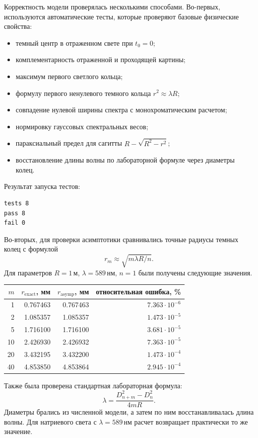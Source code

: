 \documentclass[12pt,a4paper]{article}
\begin{document}
Корректность модели проверялась несколькими способами. Во-первых, используются автоматические тесты,
которые проверяют базовые физические свойства:
\begin{itemize}
  \item темный центр в отраженном свете при \(t_0=0\);
  \item комплементарность отраженной и проходящей картины;
  \item максимум первого светлого кольца;
  \item формулу первого ненулевого темного кольца \(r^2\approx\lambda R\);
  \item совпадение нулевой ширины спектра с монохроматическим расчетом;
  \item нормировку гауссовых спектральных весов;
  \item параксиальный предел для сагитты \(R-\sqrt{R^2-r^2}\);
  \item восстановление длины волны по лабораторной формуле через диаметры колец.
\end{itemize}

Результат запуска тестов:
\begin{lstlisting}
tests 8
pass 8
fail 0
\end{lstlisting}

Во-вторых, для проверки асимптотики сравнивались точные радиусы темных колец с формулой
\[
r_m\approx \sqrt{m\lambda R/n}.
\]
Для параметров \(R=1\,\mathrm{м}\), \(\lambda=589\,\mathrm{нм}\), \(n=1\) были получены следующие
значения.

\begin{table}[h]
\centering
\begin{tabular}{rrrr}
\toprule
\(m\) & \(r_{\mathrm{exact}}\), мм & \(r_{\mathrm{asymp}}\), мм & относительная ошибка, \% \\
\midrule
1  & 0.767463 & 0.767463 & \(7.363\cdot10^{-6}\) \\
2  & 1.085357 & 1.085357 & \(1.473\cdot10^{-5}\) \\
5  & 1.716100 & 1.716100 & \(3.681\cdot10^{-5}\) \\
10 & 2.426930 & 2.426932 & \(7.363\cdot10^{-5}\) \\
20 & 3.432195 & 3.432200 & \(1.473\cdot10^{-4}\) \\
40 & 4.853850 & 4.853864 & \(2.945\cdot10^{-4}\) \\
\bottomrule
\end{tabular}
\end{table}

Также была проверена стандартная лабораторная формула:
\[
\lambda=\frac{D_{n+m}^2-D_n^2}{4mR}.
\]
Диаметры брались из численной модели, а затем по ним восстанавливалась длина волны. Для натриевого
света с \(\lambda=589\,\mathrm{нм}\) расчет возвращает практически то же значение.
\end{document}
